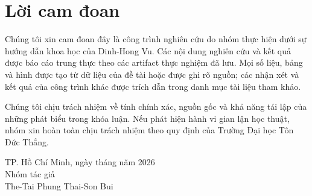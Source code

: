 \chapter*{Lời cam đoan}

Chúng tôi xin cam đoan đây là công trình nghiên cứu do nhóm thực hiện dưới sự
hướng dẫn khoa học của Dinh-Hong Vu. Các nội dung nghiên cứu và kết quả được
báo cáo trung thực theo các artifact thực nghiệm đã lưu. Mọi số liệu, bảng và
hình được tạo từ dữ liệu của đề tài hoặc được ghi rõ nguồn; các nhận xét và kết
quả của công trình khác được trích dẫn trong danh mục tài liệu tham khảo.

Chúng tôi chịu trách nhiệm về tính chính xác, nguồn gốc và khả năng tái lập của
những phát biểu trong khóa luận. Nếu phát hiện hành vi gian lận học thuật, nhóm
xin hoàn toàn chịu trách nhiệm theo quy định của Trường Đại học Tôn Đức Thắng.

\vfill
\begin{flushright}
TP. Hồ Chí Minh, ngày \hspace{0.6cm} tháng \hspace{0.6cm} năm 2026\\[0.4cm]
Nhóm tác giả\\[1.5cm]
The-Tai Phung \hspace{1.5cm} Thai-Son Bui
\end{flushright}
\clearpage
